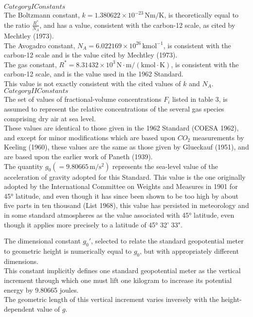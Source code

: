 \documentclass{article}
\begin{document}
$Category I Constants$\\


The Boltzmann constant, $k = 1.380622 \times 10^{-23} \, \mathrm{Nm/K}$, is theoretically equal to the ratio $\frac{R^*}{N_A}$, and has a value, consistent with the carbon-12 scale, as cited by Mechtley (1973).\\

The Avogadro constant, $N_A = 6.022169 \times 10^{26} \, \mathrm{kmol}^{-1}$, is consistent with the carbon-12 scale and is the value cited by Mechtley (1973).\\

The gas constant, $R^* = 8.31432 \times 10^{3} \, \mathrm{N \cdot m / (kmol \cdot K)}$, is consistent with the carbon-12 scale, and is the value used in the 1962 Standard.\\
This value is not exactly consistent with the cited values of $k$ and $N_A$.\\

$Category II Constants$\\

The set of values of fractional-volume concentrations $F_i$ listed in table 3, is assumed to represent the relative concentrations of the several gas species comprising dry air at sea level.\\
These values are identical to those given in the 1962 Standard (COESA 1962), and except for minor modifications which are based upon $CO_2$ measurements by Keeling (1960), these values are the same as those given by Glueckauf (1951), and are based upon the earlier work of Paneth (1939).\\

The quantity $g_0 (= 9.80665 \, \mathrm{m/s^2})$ represents the sea-level value of the acceleration of gravity adopted for this Standard. This value is the one originally adopted by the International Committee on Weights and Measures in 1901 for 45° latitude, and even though it has since been shown to be too high by about five parts in ten thousand (List 1968), this value has persisted in meteorology and in some standard atmospheres as the value associated with 45° latitude, even though it applies more precisely to a latitude of 45° 32' 33".

The dimensional constant $g_0\text{$'$}$, selected to relate the standard geopotential meter to geometric height is numerically equal to $g_0$, but with appropriately different dimensions.\\
This constant implicitly defines one standard geopotential meter as the vertical increment through which one must lift one kilogram to increase its potential energy by 9.80665 joules.\\
The geometric length of this vertical increment varies inversely with the height-dependent value of $g$.\\
\end{document}
